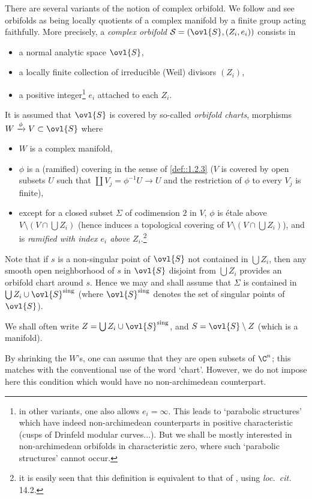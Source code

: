 \begin{para}\label{para::4.1.1} There are several variants of the notion 
 of complex orbifold. We follow \cite{calip} and see orbifolds 
 as being locally quotients of a complex manifold by a finite group 
 acting faithfully. More precisely, a {\it complex orbifold} 
 $\mathcal{S}=(\ovl{S}, (Z_i,e_i))$ consists in 
 \begin{itemize}
  \renewcommand{\labelitemi}{\normalfont\bfseries\textendash}
  \item a normal analytic space $\ovl{S}$,
  \item a locally finite collection of irreducible (Weil) divisors
	$(Z_i)$,
  \item a positive integer\footnote{in other variants, one also allows
	$e_i=\infty$. This leads to `parabolic structures' which have
	indeed non-archimedean counterparts in positive characteristic
	(cusps of Drinfeld modular curves...). But we shall be mostly
	interested in non-archimedean orbifolds in characteristic zero,
	where such `parabolic structures' cannot occur. } $e_i$
	attached to each $Z_i$.
 \end{itemize}


\medskip\noindent It is assumed that $\ovl{S}$ is covered by so-called
 {\it orbifold charts}, \ie morphisms  $W 
\xrightarrow{\phi} V \subset \ovl{S} $ where 
 \begin{itemize}
  \renewcommand{\labelitemi}{\normalfont\bfseries\textendash}
  \item $W$ is a complex manifold,
  \item $\phi$ is a (ramified) covering in the sense of \ref{def::1.2.3}
	(\ie $V$ is covered by open subsets $U$ such that $\coprod V_j =
	\phi^{-1}U \to U$ and the restriction of $\phi$ to every $V_j$
	is finite),
  \item except for a closed subset $\Sigma$ of codimension $2$ in $V$,
	$\phi$ is \'etale above $V\setminus (V\cap\bigcup Z_i)$ (hence
	induces a topological covering of $V\setminus (V\cap\bigcup
	Z_i)$), and is {\it ramified with index $e_i$ above
	$Z_i$}.\footnote{it is easily seen that this definition is equivalent
	to that of \cite{calip}, using {\it loc.~cit.} 14.2.}
 \end{itemize}

\medskip Note that if $s$ is a non-singular point of $\ovl{S}$ not
 contained in $\bigcup Z_i$, then any smooth open neighborhood of $s$ in
 $\ovl{S}$ disjoint from $\bigcup Z_i$ provides an orbifold chart around
 $s$. Hence we may and shall assume that $\Sigma $ is contained in
 $\bigcup Z_i\cup \ovl{S}^{\mathrm{sing}}$ (where $\ovl{S}^{\mathrm{sing}}$ denotes the
 set of singular points of $\ovl{S}$).
 
 \noindent We shall often write
 $Z=\bigcup Z_i\cup
 \ovl{S}^{\mathrm{sing}}$, and
 $S=\ovl{S}\setminus Z$ (which is a manifold).  

\medskip{} By shrinking the $W$'s, one can assume
 that they are open subsets of $\C^n$; this matches with the conventional
 use of the word `chart'. However, we do not impose here this condition
 which would have no non-archimedean counterpart.


\end{para}

